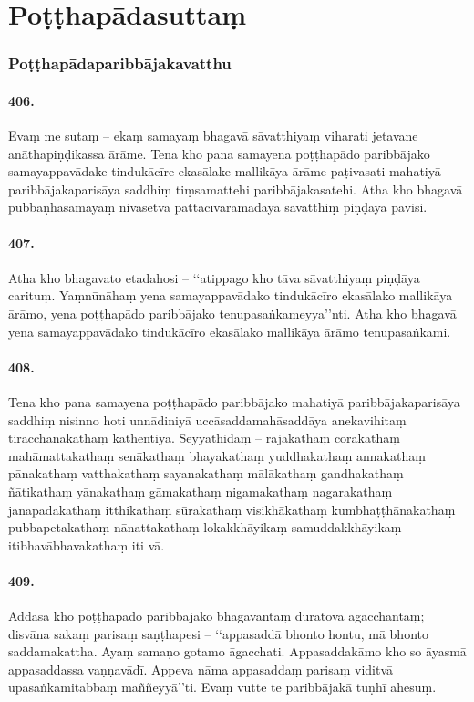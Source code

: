 \section{Poṭṭhapādasuttaṃ}

\subsubsection{Poṭṭhapādaparibbājakavatthu}

\paragraph{406.} Evaṃ me sutaṃ – ekaṃ samayaṃ bhagavā sāvatthiyaṃ viharati jetavane anāthapiṇḍikassa ārāme. Tena kho pana samayena poṭṭhapādo paribbājako samayappavādake tindukācīre ekasālake mallikāya ārāme paṭivasati mahatiyā paribbājakaparisāya saddhiṃ tiṃsamattehi paribbājakasatehi. Atha kho bhagavā pubbaṇhasamayaṃ nivāsetvā pattacīvaramādāya sāvatthiṃ piṇḍāya pāvisi.

\paragraph{407.} Atha kho bhagavato etadahosi – ‘‘atippago kho tāva sāvatthiyaṃ piṇḍāya carituṃ. Yaṃnūnāhaṃ yena samayappavādako tindukācīro ekasālako mallikāya ārāmo, yena poṭṭhapādo paribbājako tenupasaṅkameyya’’nti. Atha kho bhagavā yena samayappavādako tindukācīro ekasālako mallikāya ārāmo tenupasaṅkami.

\paragraph{408.} Tena kho pana samayena poṭṭhapādo paribbājako mahatiyā paribbājakaparisāya saddhiṃ nisinno hoti unnādiniyā uccāsaddamahāsaddāya anekavihitaṃ tiracchānakathaṃ kathentiyā. Seyyathidaṃ – rājakathaṃ corakathaṃ mahāmattakathaṃ senākathaṃ bhayakathaṃ yuddhakathaṃ annakathaṃ pānakathaṃ vatthakathaṃ sayanakathaṃ mālākathaṃ gandhakathaṃ ñātikathaṃ yānakathaṃ gāmakathaṃ nigamakathaṃ nagarakathaṃ janapadakathaṃ itthikathaṃ sūrakathaṃ visikhākathaṃ kumbhaṭṭhānakathaṃ pubbapetakathaṃ nānattakathaṃ lokakkhāyikaṃ samuddakkhāyikaṃ itibhavābhavakathaṃ iti vā.

\paragraph{409.} Addasā kho poṭṭhapādo paribbājako bhagavantaṃ dūratova āgacchantaṃ; disvāna sakaṃ parisaṃ saṇṭhapesi – ‘‘appasaddā bhonto hontu, mā bhonto saddamakattha. Ayaṃ samaṇo gotamo āgacchati. Appasaddakāmo kho so āyasmā appasaddassa vaṇṇavādī. Appeva nāma appasaddaṃ parisaṃ viditvā upasaṅkamitabbaṃ maññeyyā’’ti. Evaṃ vutte te paribbājakā tuṇhī ahesuṃ.

